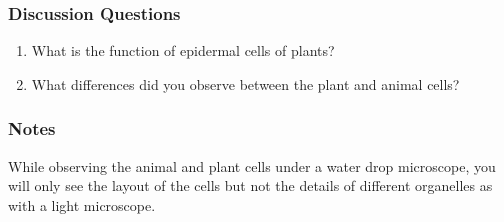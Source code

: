\subsubsection*{Discussion Questions}
\begin{enumerate}
\item{What is the function of epidermal cells of plants?}
\item{What differences did you observe between the plant and animal cells?}
\end{enumerate}

\subsubsection*{Notes}
While observing the animal and plant cells under a water drop microscope, you will only see the layout of the cells but not the details of different organelles as with a light microscope. 
